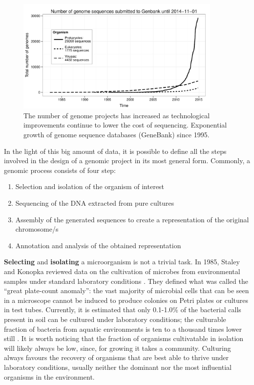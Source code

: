 \begin{figure}[!tb]
	\centering
	\includegraphics[width=0.9\textwidth]{./figures/Introduction/seq_number_genebank}
  	\caption{The number of genome projects has increased as technological improvements continue to lower the cost of sequencing. Exponential growth of genome sequence databases (GeneBank) since 1995. \label{fig:numseq}}
\end{figure}
In the light of this big amount of data, it is possible to define all the steps involved in the design of a genomic project in its most general form. Commonly, a genomic process consists of four step:
\vspace{-3mm}
\begin{enumerate}[nosep]
\item Selection and isolation of the organism of interest
\item Sequencing of the DNA extracted from pure cultures
\item Assembly of the generated sequences to create a representation of the original chromosome/s
\item Annotation and analysis of the obtained representation
\end{enumerate}
\textbf{Selecting} and \textbf{isolating} a microorganism is not a trivial task. In 1985, Staley and Konopka reviewed data on the cultivation of microbes from environmental samples under standard laboratory conditions \cite{staley1985measurement}. They defined what was called the ``great plate-count anomaly'': the vast majority of microbial cells that can be seen in a microscope cannot be induced to produce colonies on Petri plates or cultures in test tubes. Currently, it is estimated that only 0.1-1.0\% of the bacterial calls present in soil can be cultured under laboratory conditions; the culturable fraction of bacteria from aquatic environments is ten to a thousand times lower still \cite{kirk2004methods, oliver2005viable}. It is worth noticing that the fraction of organisms cultivatable in isolation will likely always be low, since, for growing it takes a community. Culturing always favours the recovery of organisms that are best able to thrive under laboratory conditions, usually neither the dominant nor the most influential organisms in the environment.\\
